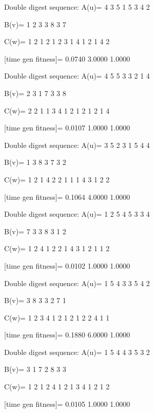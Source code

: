 Double digest sequence:
A(u)=
     4     3     5     1     5     3     4     2

B(v)=
     1     2     3     3     8     3     7

C(w)=
     1     2     1     2     1     2     3     1     4     1     2     1     4     2

[time gen fitness]=
    0.0740    3.0000    1.0000

Double digest sequence:
A(u)=
     4     5     5     3     3     2     1     4

B(v)=
     2     3     1     7     3     3     8

C(w)=
     2     2     1     1     3     4     1     2     1     2     1     2     1     4

[time gen fitness]=
    0.0107    1.0000    1.0000

Double digest sequence:
A(u)=
     3     5     2     3     1     5     4     4

B(v)=
     1     3     8     3     7     3     2

C(w)=
     1     2     1     4     2     2     1     1     1     4     3     1     2     2

[time gen fitness]=
    0.1064    4.0000    1.0000

Double digest sequence:
A(u)=
     1     2     5     4     5     3     3     4

B(v)=
     7     3     3     8     3     1     2

C(w)=
     1     2     4     1     2     2     1     4     3     1     2     1     1     2

[time gen fitness]=
    0.0102    1.0000    1.0000

Double digest sequence:
A(u)=
     1     5     4     3     3     5     4     2

B(v)=
     3     8     3     3     2     7     1

C(w)=
     1     2     3     4     1     2     1     2     1     2     2     4     1     1

[time gen fitness]=
    0.1880    6.0000    1.0000

Double digest sequence:
A(u)=
     1     5     4     4     3     5     3     2

B(v)=
     3     1     7     2     8     3     3

C(w)=
     1     2     1     2     4     1     2     1     3     4     1     2     1     2

[time gen fitness]=
    0.0105    1.0000    1.0000

